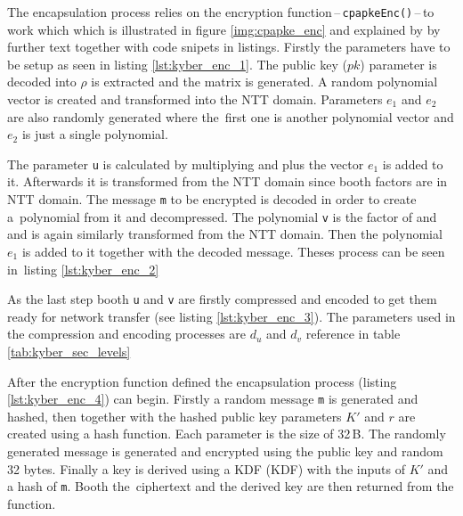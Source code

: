 The encapsulation process relies on the encryption function\,--\,\texttt{cpapkeEnc()}\,--\,to work which which is illustrated in figure \ref{img:cpapke_enc} and explained by by further text together with code snipets in listings. Firstly the parameters have to be setup as seen in listing \ref{lst:kyber_enc_1}. The public key ($pk$) parameter is decoded into  $\rho$ is extracted and the matrix  is generated. A random polynomial vector  is created and transformed into the NTT domain. Parameters $e_1$ and $e_2$ are also randomly generated where the~first one is another polynomial vector and $e_2$ is just a single polynomial.

The parameter \texttt{u} is calculated by multiplying  and  plus the vector $e_1$ is added to it. Afterwards it is transformed from the NTT domain since booth factors are in NTT domain. The message \texttt{m} to be encrypted is decoded in order to create a~polynomial from it and decompressed. The polynomial \texttt{v} is the factor of  and  and is again similarly transformed from the NTT domain. Then the polynomial $e_1$ is added to it together with the decoded message. Theses process can be seen in~listing \ref{lst:kyber_enc_2}

As the last step booth \texttt{u} and \texttt{v} are firstly compressed and encoded to get them ready for network transfer (see listing \ref{lst:kyber_enc_3}). The parameters used in the compression and encoding processes are $d_u$ and $d_v$ reference in table \ref{tab:kyber_sec_levels}

\newpage
{}

After the encryption function defined the encapsulation process (listing \ref{lst:kyber_enc_4}) can begin. Firstly a random message \texttt{m} is generated and hashed, then together with the hashed public key parameters $K'$ and $r$ are created using a hash function. Each parameter is the size of 32\,B. The randomly generated message is generated and encrypted using the public key and random 32 bytes. Finally a key is derived using a KDF (\acl{KDF}) with the inputs of $K'$ and a hash of \texttt{m}. Booth the~ciphertext and the derived key are then returned from the function.
\newpage
{}
